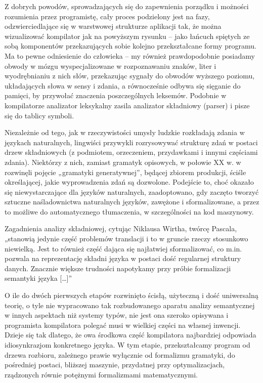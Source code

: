 Z dobrych powodów, sprowadzających się do zapewnienia porządku i możności rozumienia przez programistę, cały proces podzielony jest na fazy, odzwierciedlające się w warstwowej strukturze aplikacji tak, że można wizualizować kompilator jak na powyższym rysunku – jako łańcuch spiętych ze sobą komponentów przekazujących sobie kolejno przekształcane formy programu. Ma to pewne odniesienie do człowieka – my również prawdopodobnie posiadamy obwody w mózgu wyspecjalizowane w rozpoznawaniu znaków, liter i wyodrębnianiu z nich słów, przekazując sygnały do obwodów wyższego poziomu, układających słowa w sensy i zdania, a równocześnie odbywa się sięganie do pamięci, by przywołać znaczenia poszczególnych leksemów. Podobnie w kompilatorze analizator leksykalny zasila analizator składniowy (parser) i pisze się do tablicy symboli.

Niezależnie od tego, jak w rzeczywistości umysły ludzkie rozkładają zdania w językach naturalnych, lingwiści przywykli rozrysowywać strukturę zdań w postaci drzew składniowych (z podmiotem, orzeczeniem, przydawkami i innymi częściami zdania). Niektórzy z nich, zamiast gramatyk opisowych, w połowie XX w. w rozwinęli pojęcie „gramatyki generatywnej”, będącej zbiorem produkcji, ściśle określającej, jakie wyprowadzenia zdań są dozwolone.\cite{Chomsky1956} Podejście to, choć okazało się niewystarczające dla języków naturalnych, zaadoptowano, gdy zaczęto tworzyć sztuczne naśladownictwa naturalnych języków, zawężone i sformalizowane, a przez to możliwe do automatycznego tłumaczenia, w szczególności na kod maszynowy. 

Zagadnienia analizy składniowej,  cytując Niklausa Wirtha, twórcę Pascala, „stanowią jedynie część problemów translacji i to w gruncie rzeczy stosunkowo niewielką. Jest to również część dająca się najłatwiej sformalizować, co m.in. pozwala na reprezentację składni języka w postaci dość regularnej struktury danych. Znacznie większe trudności napotykamy przy próbie formalizacji semantyki języka […]” \cite[str.~317]{wirth_alogorytmy_struktury_danych}

O ile do dwóch pierwszych etapów rozwinięto ścisłą, użyteczną i dość uniwersalną teorię\cite{martin1998intuitionistic_types}\cite{TAPL}, o tyle nie wypracowano tak rozbudowanego aparatu analizy semantycznej w innych aspektach niż systemy typów, nie jest ona szeroko opisywana i programista kompilatora polegać musi w wielkiej części na własnej inwencji\cite{waite_goos}. Dzieje się tak dlatego, że owa środkowa część kompilatora najbardziej odpowiada idiosynkrazjom konkretnego języka. W tym etapie, przekształcamy program od drzewa rozbioru, zależnego prawie wyłącznie od formalizmu gramatyki, do pośredniej postaci, bliższej maszynie, przydatnej przy optymalizacjach, rządzonych równie potężnymi formalizmami matematycznymi. 

